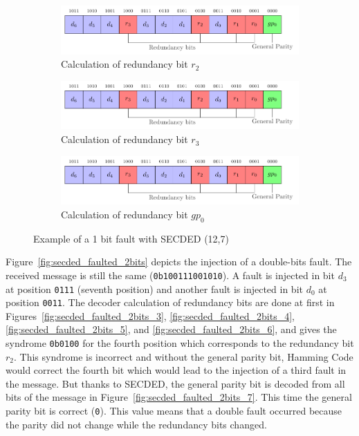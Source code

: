 \begin{figure}[ht]
    \hfill
    \begin{subfigure}[b]{0.49\textwidth}
        \includegraphics[width=\textwidth, page=9]{c5_countermeasures_dift/img/secded.pdf}
        \caption{Calculation of redundancy bit $r_2$}
        \label{fig:secded_faulted_1bit_5}
    \end{subfigure}
    \hfill
    \begin{subfigure}[b]{0.49\textwidth}
        \includegraphics[width=\textwidth, page=10]{c5_countermeasures_dift/img/secded.pdf}
        \caption{Calculation of redundancy bit $r_3$}
        \label{fig:secded_faulted_1bit_6}
    \end{subfigure}
    \hfill
    \begin{subfigure}[b]{0.49\textwidth}
        \includegraphics[width=\textwidth, page=11]{c5_countermeasures_dift/img/secded.pdf}
        \caption{Calculation of redundancy bit $gp_0$}
        \label{fig:secded_faulted_1bit_7}
    \end{subfigure}
    \caption{Example of a 1 bit fault with SECDED (12,7)}
    \label{fig:secded_faulted_1bit}
\end{figure}

Figure~\ref{fig:secded_faulted_2bits} depicts the injection of a double-bits fault. The received message is still the same (\texttt{0b100111001010}). A fault is injected in bit $d_3$ at position \texttt{0111} (seventh position) and another fault is injected in bit $d_0$ at position \texttt{0011}.
The decoder calculation of redundancy bits are done at first in Figures~\ref{fig:secded_faulted_2bits_3}, \ref{fig:secded_faulted_2bits_4}, \ref{fig:secded_faulted_2bits_5}, and \ref{fig:secded_faulted_2bits_6}, and gives the syndrome \texttt{0b0100} for the fourth position which corresponds to the redundancy bit $r_2$. This syndrome is incorrect and without the general parity bit, Hamming Code would correct the fourth bit which would lead to the injection of a third fault in the message.
But thanks to SECDED, the general parity bit is decoded from all bits of the message in Figure~\ref{fig:secded_faulted_2bits_7}. This time the general parity bit is correct (\texttt{0}). This value means that a double fault occurred because the parity did not change while the redundancy bits changed.

